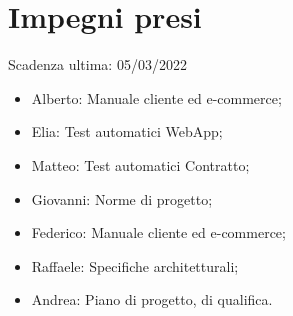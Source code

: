 \documentclass[a4paper, 12pt]{article}
\begin{document}
\section{Impegni presi}
Scadenza ultima: 05/03/2022
\begin{itemize}
	\item Alberto: Manuale cliente ed e-commerce;
	\item Elia: Test automatici WebApp;
	\item Matteo: Test automatici Contratto;
	\item Giovanni: Norme di progetto;
	\item Federico: Manuale cliente ed e-commerce;
	\item Raffaele: Specifiche architetturali;
	\item Andrea: Piano di progetto, di qualifica.
\end{itemize}
\end{document}
